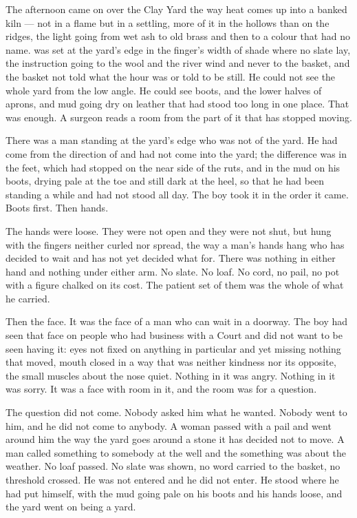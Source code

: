 The afternoon came on over the Clay Yard the way heat comes up into a banked kiln --- not in a flame but in a settling, more of it in the hollows than on the ridges, the light going from wet ash to old brass and then to a colour that had no name.  was set at the yard's edge in the finger's width of shade where no slate lay, the instruction going to the wool and the river wind and never to the basket, and the basket not told what the hour was or told to be still. He could not see the whole yard from the low angle. He could see boots, and the lower halves of aprons, and mud going dry on leather that had stood too long in one place. That was enough. A surgeon reads a room from the part of it that has stopped moving.

There was a man standing at the yard's edge who was not of the yard. He had come from the direction of  and had not come into the yard; the difference was in the feet, which had stopped on the near side of the ruts, and in the mud on his boots, drying pale at the toe and still dark at the heel, so that he had been standing a while and had not stood all day. The boy took it in the order it came. Boots first. Then hands.

The hands were loose. They were not open and they were not shut, but hung with the fingers neither curled nor spread, the way a man's hands hang who has decided to wait and has not yet decided what for. There was nothing in either hand and nothing under either arm. No slate. No loaf. No cord, no pail, no pot with a figure chalked on its cost. The patient set of them was the whole of what he carried.

Then the face. It was the face of a man who can wait in a doorway. The boy had seen that face on people who had business with a Court and did not want to be seen having it: eyes not fixed on anything in particular and yet missing nothing that moved, mouth closed in a way that was neither kindness nor its opposite, the small muscles about the nose quiet. Nothing in it was angry. Nothing in it was sorry. It was a face with room in it, and the room was for a question.

The question did not come. Nobody asked him what he wanted. Nobody went to him, and he did not come to anybody. A woman passed with a pail and went around him the way the yard goes around a stone it has decided not to move. A man called something to somebody at the well and the something was about the weather. No loaf passed. No slate was shown, no word carried to the basket, no threshold crossed. He was not entered and he did not enter. He stood where he had put himself, with the mud going pale on his boots and his hands loose, and the yard went on being a yard.

